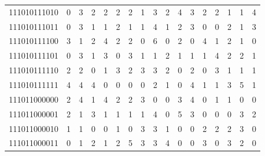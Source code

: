 \documentclass[10pt,a4paper]{article}
\begin{document}
\begin{longtable}{ |c|c|c|c|c|c|c|c|c|c|c|c|c|c|c|c|c| }
    111010111010              & 0                            & 3                                & 2                            & 2                              & 2   & 2   & 1   & 3   & 2   & 4   & 3   & 2   & 2   & 1   & 1   & 4   \\
    111010111011              & 0                            & 3                                & 1                            & 1                              & 2   & 1   & 1   & 4   & 1   & 2   & 3   & 0   & 0   & 2   & 1   & 3   \\
    111010111100              & 3                            & 1                                & 2                            & 4                              & 2   & 2   & 0   & 6   & 0   & 2   & 0   & 4   & 1   & 2   & 1   & 0   \\
    111010111101              & 0                            & 3                                & 1                            & 3                              & 0   & 3   & 1   & 1   & 2   & 1   & 1   & 1   & 4   & 2   & 2   & 1   \\
    111010111110              & 2                            & 2                                & 0                            & 1                              & 3   & 2   & 3   & 3   & 2   & 0   & 2   & 0   & 3   & 1   & 1   & 1   \\
    111010111111              & 4                            & 4                                & 4                            & 0                              & 0   & 0   & 0   & 2   & 1   & 0   & 4   & 1   & 1   & 3   & 5   & 1   \\
    111011000000              & 2                            & 4                                & 1                            & 4                              & 2   & 2   & 3   & 0   & 0   & 3   & 4   & 0   & 1   & 1   & 0   & 0   \\
    111011000001              & 2                            & 1                                & 3                            & 1                              & 1   & 1   & 1   & 4   & 0   & 5   & 3   & 0   & 0   & 0   & 3   & 2   \\
    111011000010              & 1                            & 1                                & 0                            & 0                              & 1   & 0   & 3   & 3   & 1   & 0   & 0   & 2   & 2   & 2   & 3   & 0   \\
    111011000011              & 0                            & 1                                & 2                            & 1                              & 2   & 5   & 3   & 3   & 4   & 0   & 0   & 3   & 0   & 3   & 2   & 0   \\

\end{longtable}
\end{document}
